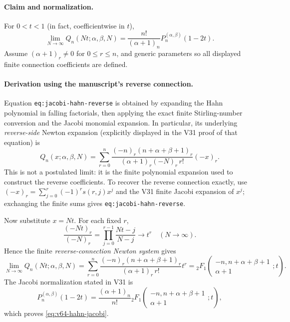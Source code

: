 \documentclass[11pt]{article}
\begin{document}
\paragraph{Claim and normalization.} For $0< t<1$ (in fact, coefficientwise in $t$),
\begin{equation}\label{eq:v64-hahn-jacobi}
\boxed{\displaystyle\lim_{N\to\infty}Q_n(Nt;\alpha,\beta,N)
=\frac{n!}{(\alpha+1)_n}P_n^{(\alpha,\beta)}(1-2t).}
\end{equation}
Assume $(\alpha+1)_r\ne0$ for $0\le r\le n$, and generic parameters so all displayed finite connection coefficients are defined.

\paragraph{Derivation using the manuscript's reverse connection.}
Equation \texttt{eq:jacobi-hahn-reverse} is obtained by expanding the Hahn polynomial in falling factorials, then applying the exact finite Stirling-number conversion and the Jacobi monomial expansion. In particular, its underlying \emph{reverse-side} Newton expansion (explicitly displayed in the V31 proof of that equation) is
\begin{equation}\label{eq:v64-newton}
Q_n(x;\alpha,\beta,N)=\sum_{r=0}^n
\frac{(-n)_r(n+\alpha+\beta+1)_r}{(\alpha+1)_r(-N)_r\,r!}(-x)_r.
\end{equation}
This is not a postulated limit: it is the finite polynomial expansion used to construct the reverse coefficients. To recover the reverse connection exactly, use
$(-x)_r=\sum_{j=0}^r(-1)^r s(r,j)x^j$ and the V31 finite Jacobi expansion of $x^j$; exchanging the finite sums gives \texttt{eq:jacobi-hahn-reverse}.

Now substitute $x=Nt$. For each fixed $r$,
\[
\frac{(-Nt)_r}{(-N)_r}
=\prod_{j=0}^{r-1}\frac{Nt-j}{N-j}\longrightarrow t^r
\quad(N\to\infty).
\]
Hence the finite \emph{reverse-connection Newton system} gives
\[
\lim_{N\to\infty}Q_n(Nt;\alpha,\beta,N)
=\sum_{r=0}^n\frac{(-n)_r(n+\alpha+\beta+1)_r}
{(\alpha+1)_r\,r!}t^r
={}_2F_1\!\left(\begin{matrix}-n,n+\alpha+\beta+1\\\alpha+1\end{matrix};t\right).
\]
The Jacobi normalization stated in V31 is
\[
P_n^{(\alpha,\beta)}(1-2t)=\frac{(\alpha+1)_n}{n!}
{}_2F_1\!\left(\begin{matrix}-n,n+\alpha+\beta+1\\\alpha+1\end{matrix};t\right),
\]
which proves \eqref{eq:v64-hahn-jacobi}.
\end{document}
